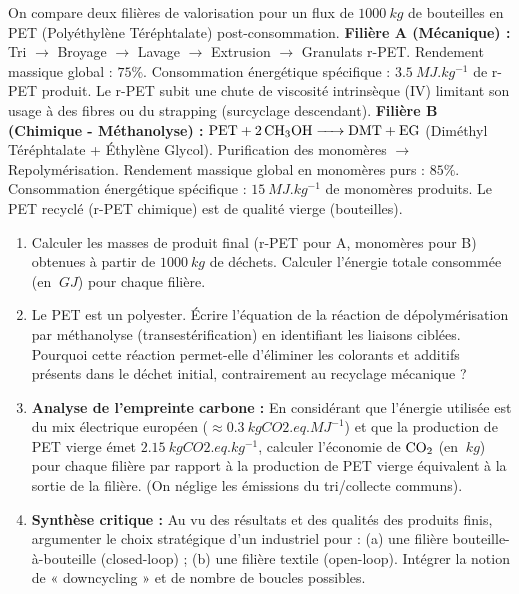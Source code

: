 \documentclass[11pt]{article}
\begin{document}
\begin{exercice}
On compare deux filières de valorisation pour un flux de $\SI{1000}{kg}$ de bouteilles en PET (Polyéthylène Téréphtalate) post-consommation.
\textbf{Filière A (Mécanique) :} Tri $\rightarrow$ Broyage $\rightarrow$ Lavage $\rightarrow$ Extrusion $\rightarrow$ Granulats r-PET. Rendement massique global : $75\%$. Consommation énergétique spécifique : $\SI{3,5}{MJ.kg^{-1}}$ de r-PET produit. Le r-PET subit une chute de viscosité intrinsèque (IV) limitant son usage à des fibres ou du strapping (surcyclage descendant).
\textbf{Filière B (Chimique - Méthanolyse) :} $\ce{PET + 2 CH3OH -> DMT + EG}$ (Diméthyl Téréphtalate + Éthylène Glycol). Purification des monomères $\rightarrow$ Repolymérisation. Rendement massique global en monomères purs : $85\%$. Consommation énergétique spécifique : $\SI{15}{MJ.kg^{-1}}$ de monomères produits. Le PET recyclé (r-PET chimique) est de qualité vierge (bouteilles).
\begin{enumerate}
    \item Calculer les masses de produit final (r-PET pour A, monomères pour B) obtenues à partir de $\SI{1000}{kg}$ de déchets. Calculer l'énergie totale consommée (en $\SI{}{GJ}$) pour chaque filière.
    \item Le PET est un polyester. Écrire l'équation de la réaction de dépolymérisation par méthanolyse (transestérification) en identifiant les liaisons ciblées. Pourquoi cette réaction permet-elle d'éliminer les colorants et additifs présents dans le déchet initial, contrairement au recyclage mécanique ?
    \item \textbf{Analyse de l'empreinte carbone :} En considérant que l'énergie utilisée est du mix électrique européen ($\approx \SI{0,3}{kg CO2.eq.MJ^{-1}}$) et que la production de PET vierge émet $\SI{2,15}{kg CO2.eq.kg^{-1}}$, calculer l'économie de $\ce{CO2}$ (en $\SI{}{kg}$) pour chaque filière par rapport à la production de PET vierge équivalent à la sortie de la filière. (On néglige les émissions du tri/collecte communs).
    \item \textbf{Synthèse critique :} Au vu des résultats et des qualités des produits finis, argumenter le choix stratégique d'un industriel pour : (a) une filière bouteille-à-bouteille (closed-loop) ; (b) une filière textile (open-loop). Intégrer la notion de « downcycling » et de nombre de boucles possibles.
\end{enumerate}
\end{exercice}
\end{document}
